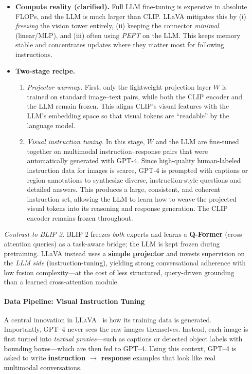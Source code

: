 \begin{enrichment}
\begin{enrichment}
\begin{itemize}
            \item \textbf{Compute reality (clarified).} Full LLM fine-tuning is expensive in absolute FLOPs, and the LLM is much larger than CLIP. LLaVA mitigates this by (i) \emph{freezing} the vision tower entirely, (ii) keeping the connector \emph{minimal} (linear/MLP), and (iii) often using \emph{PEFT} on the LLM. This keeps memory stable and concentrates updates where they matter most for following instructions.
            \item \textbf{Two-stage recipe.} 
            \begin{enumerate}
                \item \emph{Projector warmup.} First, only the lightweight projection layer $W$ is trained on standard image–text pairs, while both the CLIP encoder and the LLM remain frozen. This aligns CLIP’s visual features with the LLM’s embedding space so that visual tokens are “readable” by the language model.
                \item \emph{Visual instruction tuning.} In this stage, $W$ and the LLM are fine-tuned together on multimodal instruction–response pairs that were automatically generated with GPT-4. Since high-quality human-labeled instruction data for images is scarce, GPT-4 is prompted with captions or region annotations to synthesize diverse, instruction-style questions and detailed answers. This produces a large, consistent, and coherent instruction set, allowing the LLM to learn how to weave the projected visual tokens into its reasoning and response generation. The CLIP encoder remains frozen throughout.
            \end{enumerate}
        \end{itemize}
        
        \noindent\emph{Contrast to BLIP-2.} BLIP-2 freezes \emph{both} experts and learns a \textbf{Q-Former} (cross-attention queries) as a task-aware bridge; the LLM is kept frozen during pretraining. LLaVA instead uses a \textbf{simple projector} and invests supervision on the \emph{LLM side} (instruction-tuning), yielding strong conversational adherence with low fusion complexity—at the cost of less structured, query-driven grounding than a learned cross-attention module.
        
        \paragraph{Data Pipeline: Visual Instruction Tuning}
        A central innovation in \textsc{LLaVA}~\cite{liu2023_llava} is how its training data is generated. Importantly, GPT--4 never sees the raw images themselves. Instead, each image is first turned into \emph{textual proxies}---such as captions or detected object labels with bounding boxes---which are then fed to GPT--4. Using this context, GPT--4 is asked to write \textbf{instruction $\rightarrow$ response} examples that look like real multimodal conversations.
        

\end{enrichment}
\end{enrichment}
